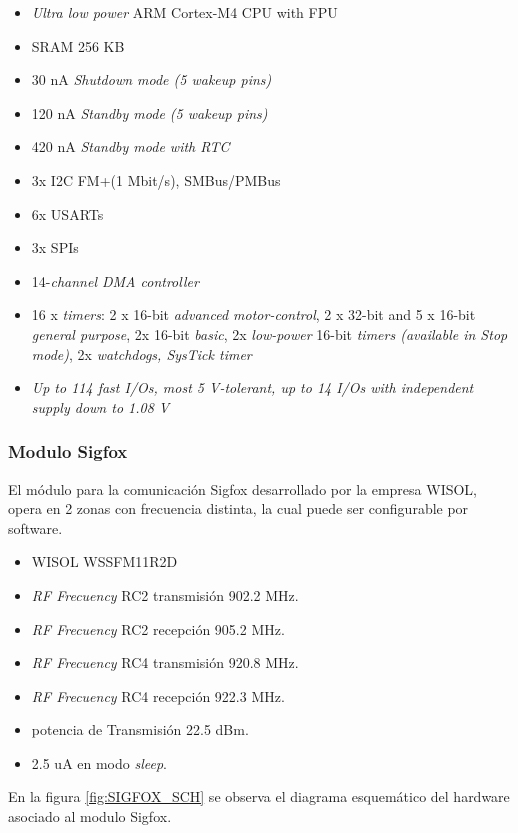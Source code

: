 \begin{itemize}
    \item \textit{Ultra low power} ARM Cortex\textregistered-M4  CPU with FPU
    \item  SRAM 256 KB
    \item 30 nA \textit{Shutdown mode (5 wakeup pins)}
    \item 120 nA \textit{Standby mode (5 wakeup pins)}
    \item 420 nA \textit{Standby mode with RTC}
   \item 3x I2C FM+(1 Mbit/s), SMBus/PMBus 
   \item 6x USARTs
   \item 3x SPIs
   \item 14-\textit{channel DMA controller}
    \item 16 x \textit{ timers}: 2 x 16-bit \textit{advanced motor-control}, 2 x 32-bit and 5 x 16-bit \textit{general purpose}, 2x 16-bit \textit{basic}, 2x \textit{low-power} 16-bit \textit{timers (available in Stop mode)}, 2x \textit{watchdogs, SysTick timer}
    \item \textit{Up to 114 fast I/Os, most 5 V-tolerant, up to 14 I/Os with independent supply down to 1.08 V}
\end{itemize}



\subsubsection{Modulo Sigfox}
El módulo para la comunicación Sigfox desarrollado por la empresa WISOL, opera en 2 zonas con frecuencia distinta, la cual puede ser configurable por software.
\begin{itemize}
    \item WISOL WSSFM11R2D \protect\footnotemark
    \item \textit{RF Frecuency} RC2 transmisión 902.2 MHz.
    \item \textit{RF Frecuency} RC2 recepción 905.2 MHz.
    \item \textit{RF Frecuency} RC4 transmisión 920.8 MHz.
    \item \textit{RF Frecuency} RC4 recepción 922.3 MHz.
    \item potencia de Transmisión 22.5 dBm.
    \item 2.5 uA en modo \textit{sleep}.
\end{itemize}

En la figura \ref{fig:SIGFOX_SCH} se observa el diagrama esquemático del hardware asociado al modulo Sigfox.

